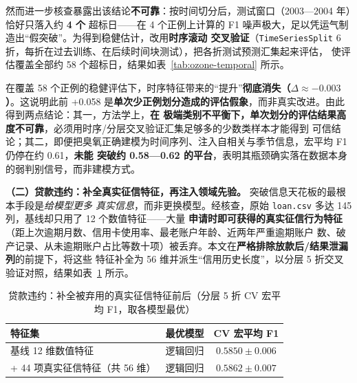 \documentclass[12pt,a4paper,fontset=fandol]{ctexart}
\numberwithin{figure}{section}
\numberwithin{table}{section}
\numberwithin{equation}{section}
\begin{document}
然而进一步核查暴露出该结论\textbf{不可靠}：按时间切分后，测试窗口（2003—2004 年）恰好只落入约 \textbf{4 个}
超标日——在 4 个正例上计算的 F1 噪声极大，足以凭运气制造出“假突破”。为得到稳健估计，改用\textbf{时序滚动
交叉验证}（\texttt{TimeSeriesSplit} 6 折，每折在过去训练、在后续时间块测试），把各折测试预测汇集起来评估，
使评估覆盖全部约 58 个超标日，结果如表~\ref{tab:ozone-temporal} 所示。

\begin{table}[H]
  \centering
  \caption{臭氧：单次时序划分 vs 时序CV汇集评估（最优宏平均 F1）}
  \label{tab:ozone-temporal}
\end{table}

在覆盖 58 个正例的稳健评估下，时序特征带来的“提升”\textbf{彻底消失（$\Delta\approx-0.003$）}。这说明此前
+0.058 是\textbf{单次少正例划分造成的评估假象}，而非真实改进。由此得到两点结论：其一，方法学上，\textbf{在
极端类别不平衡下，单次划分的评估结果高度不可靠}，必须用时序/分层交叉验证汇集足够多的少数类样本才能得到
可信结论；其二，即便把臭氧正确建模为时间序列、注入自相关与季节信息，宏平均 F1 仍停在约 0.61，\textbf{未能
突破约 0.58—0.62 的平台}，表明其瓶颈确实落在数据本身的弱判别信号，而非建模方式。

\textbf{（二）贷款违约：补全真实征信特征，再注入领域先验。} 突破信息天花板的最根本手段是\emph{给模型更多
真实信息}，而非更换模型。经核查，原始 \texttt{loan.csv} 多达 145 列，基线却只用了 12 个数值特征——大量
\textbf{申请时即可获得的真实征信行为特征}（距上次逾期月数、信用卡使用率、最老账户年龄、近两年严重逾期账户
数、破产记录、从未逾期账户占比等数十项）被丢弃。本文在\textbf{严格排除放款后/结果泄漏列}的前提下，将这些
特征补全为 56 维并派生“信用历史长度”，以分层 5 折交叉验证对照，结果如表~\ref{tab:credit-deep} 所示。

\begin{table}[H]
  \centering
  \caption{贷款违约：补全被弃用的真实征信特征前后（分层 5 折 CV 宏平均 F1，取各模型最优）}
  \label{tab:credit-deep}
  \begin{tabular}{lcc}
    \toprule
    特征集 & 最优模型 & CV 宏平均 F1 \\
    \midrule
    基线 12 维数值特征 & 逻辑回归 & $0.5850\pm0.006$ \\
    + 44 项真实征信特征（共 56 维） & 逻辑回归 & $0.5862\pm0.007$ \\
    \bottomrule
  \end{tabular}
\end{table}
\end{document}
